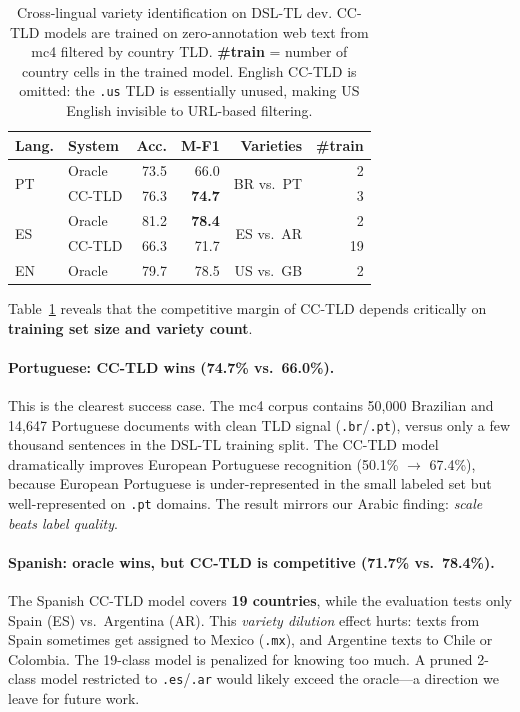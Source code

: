 \documentclass[11pt]{article}
\begin{document}
\begin{table}[t]
\centering
\small
\setlength{\tabcolsep}{5pt}
\begin{tabular}{llrrrr}
\toprule
\textbf{Lang.} & \textbf{System} & \textbf{Acc.} & \textbf{M-F1} & \textbf{Varieties} & \textbf{\#train} \\
\midrule
\multirow{2}{*}{PT} & Oracle  & 73.5 & 66.0 & \multirow{2}{*}{BR vs.\ PT} & 2 \\
                    & CC-TLD  & 76.3 & \textbf{74.7} &  & 3 \\
\midrule
\multirow{2}{*}{ES} & Oracle  & 81.2 & \textbf{78.4} & \multirow{2}{*}{ES vs.\ AR} & 2 \\
                    & CC-TLD  & 66.3 & 71.7 & & 19 \\
\midrule
EN  & Oracle  & 79.7 & 78.5 & US vs.\ GB & 2 \\
\bottomrule
\end{tabular}
\caption{Cross-lingual variety identification on DSL-TL dev.
CC-TLD models are trained on zero-annotation web text from mc4 filtered by
country TLD. \textbf{\#train} = number of country cells in the trained model.
English CC-TLD is omitted: the \texttt{.us} TLD is essentially unused,
making US English invisible to URL-based filtering.}
\label{tab:crosslingual}
\end{table}

Table~\ref{tab:crosslingual} reveals that the competitive margin of CC-TLD
depends critically on \textbf{training set size and variety count}.

\paragraph{Portuguese: CC-TLD wins (74.7\% vs.\ 66.0\%).}
This is the clearest success case. The mc4 corpus contains 50{,}000 Brazilian
and 14{,}647 Portuguese documents with clean TLD signal (\texttt{.br}/\texttt{.pt}),
versus only a few thousand sentences in the DSL-TL training split.
The CC-TLD model dramatically improves European Portuguese recognition
(50.1\% $\to$ 67.4\%), because European Portuguese is under-represented in
the small labeled set but well-represented on \texttt{.pt} domains.
The result mirrors our Arabic finding: \emph{scale beats label quality}.

\paragraph{Spanish: oracle wins, but CC-TLD is competitive (71.7\% vs.\ 78.4\%).}
The Spanish CC-TLD model covers \textbf{19 countries}, while the evaluation
tests only Spain (ES) vs.\ Argentina (AR).  This \emph{variety dilution} effect
hurts: texts from Spain sometimes get assigned to Mexico (\texttt{.mx}), and
Argentine texts to Chile or Colombia.  The 19-class model is penalized for
knowing too much.  A pruned 2-class model restricted to \texttt{.es}/\texttt{.ar}
would likely exceed the oracle---a direction we leave for future work.
\end{document}
